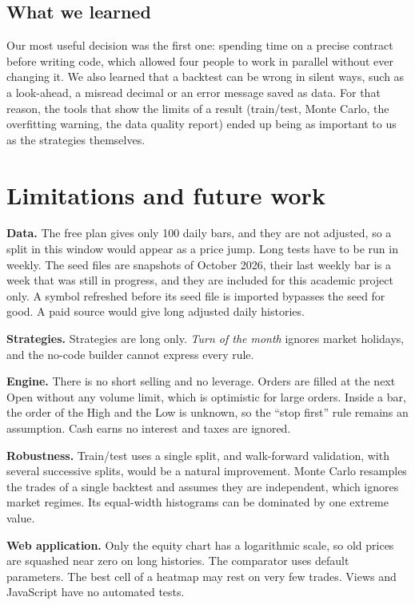 \documentclass[11pt,a4paper]{article}
\begin{document}
\subsection{What we learned}

Our most useful decision was the first one: spending time on a precise contract before writing code, which allowed four people to work in parallel without ever changing it. We also learned that a backtest can be wrong in silent ways, such as a look-ahead, a misread decimal or an error message saved as data. For that reason, the tools that show the limits of a result (train/test, Monte Carlo, the overfitting warning, the data quality report) ended up being as important to us as the strategies themselves.

\section{Limitations and future work}

\textbf{Data.} The free plan gives only 100 daily bars, and they are not adjusted, so a split in this window would appear as a price jump. Long tests have to be run in weekly. The seed files are snapshots of October 2026, their last weekly bar is a week that was still in progress, and they are included for this academic project only. A symbol refreshed before its seed file is imported bypasses the seed for good. A paid source would give long adjusted daily histories.

\textbf{Strategies.} Strategies are long only. \textit{Turn of the month} ignores market holidays, and the no-code builder cannot express every rule.

\textbf{Engine.} There is no short selling and no leverage. Orders are filled at the next Open without any volume limit, which is optimistic for large orders. Inside a bar, the order of the High and the Low is unknown, so the ``stop first'' rule remains an assumption. Cash earns no interest and taxes are ignored.

\textbf{Robustness.} Train/test uses a single split, and walk-forward validation, with several successive splits, would be a natural improvement. Monte Carlo resamples the trades of a single backtest and assumes they are independent, which ignores market regimes. Its equal-width histograms can be dominated by one extreme value.

\textbf{Web application.} Only the equity chart has a logarithmic scale, so old prices are squashed near zero on long histories. The comparator uses default parameters. The best cell of a heatmap may rest on very few trades. Views and JavaScript have no automated tests.
\end{document}
